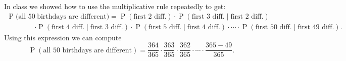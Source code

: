 \documentclass[answers,11pt]{exam}
\DeclareMathOperator*{\Prob}{P}
\renewcommand{\Pr}{\Prob}
\begin{document}
\begin{questions}
\begin{solution}
%

In class we showed how to use the multiplicative rule repeatedly to get:
\begin{align*}
\Pr(\text{all 50} &\text{ birthdays are different})
  = 
  \Pr(\text{first 2 diff.}) \cdot \Pr(\text{first 3 diff.} \mid \text{first 2 diff.}) \\
  &\cdot \Pr(\text{first 4 diff.} \mid \text{first 3 diff.})
  \cdot \Pr(\text{first 5 diff.} \mid \text{first 4 diff.})
  \cdot \dotsb
  \cdot \Pr(\text{first 50 diff.} \mid \text{first 49 diff.}).
\end{align*}
Using this expression we can compute
\[
\Pr(\text{all 50 birthdays are different})
  =
  \frac{364}{365}
  \cdot \frac{363}{365}
  \cdot \frac{362}{365}
  \cdot \dotsb
  \cdot \frac{365 - 49}{365}.
\]


\end{solution}
\end{questions}
\end{document}
